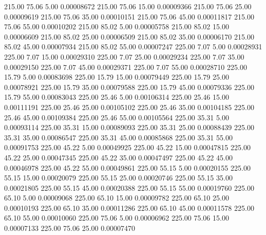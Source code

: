     215.00     75.06      5.00     0.00008672
    215.00     75.06     15.00     0.00009366
    215.00     75.06     25.00     0.00009619
    215.00     75.06     35.00     0.00010151
    215.00     75.06     45.00     0.00011817
    215.00     75.06     55.00     0.00010202
    215.00     85.02      5.00     0.00005758
    215.00     85.02     15.00     0.00006609
    215.00     85.02     25.00     0.00006509
    215.00     85.02     35.00     0.00006170
    215.00     85.02     45.00     0.00007934
    215.00     85.02     55.00     0.00007247
    225.00      7.07      5.00     0.00028931
    225.00      7.07     15.00     0.00029310
    225.00      7.07     25.00     0.00029234
    225.00      7.07     35.00     0.00029150
    225.00      7.07     45.00     0.00029371
    225.00      7.07     55.00     0.00028710
    225.00     15.79      5.00     0.00083698
    225.00     15.79     15.00     0.00079449
    225.00     15.79     25.00     0.00078921
    225.00     15.79     35.00     0.00079588
    225.00     15.79     45.00     0.00079336
    225.00     15.79     55.00     0.00083043
    225.00     25.46      5.00     0.00106314
    225.00     25.46     15.00     0.00111191
    225.00     25.46     25.00     0.00105102
    225.00     25.46     35.00     0.00104185
    225.00     25.46     45.00     0.00109384
    225.00     25.46     55.00     0.00105564
    225.00     35.31      5.00     0.00093114
    225.00     35.31     15.00     0.00089093
    225.00     35.31     25.00     0.00088439
    225.00     35.31     35.00     0.00086547
    225.00     35.31     45.00     0.00085868
    225.00     35.31     55.00     0.00091753
    225.00     45.22      5.00     0.00049925
    225.00     45.22     15.00     0.00047815
    225.00     45.22     25.00     0.00047345
    225.00     45.22     35.00     0.00047497
    225.00     45.22     45.00     0.00046978
    225.00     45.22     55.00     0.00049861
    225.00     55.15      5.00     0.00020155
    225.00     55.15     15.00     0.00020079
    225.00     55.15     25.00     0.00020746
    225.00     55.15     35.00     0.00021805
    225.00     55.15     45.00     0.00020388
    225.00     55.15     55.00     0.00019760
    225.00     65.10      5.00     0.00009068
    225.00     65.10     15.00     0.00009782
    225.00     65.10     25.00     0.00010193
    225.00     65.10     35.00     0.00011286
    225.00     65.10     45.00     0.00011578
    225.00     65.10     55.00     0.00010060
    225.00     75.06      5.00     0.00006962
    225.00     75.06     15.00     0.00007133
    225.00     75.06     25.00     0.00007470

